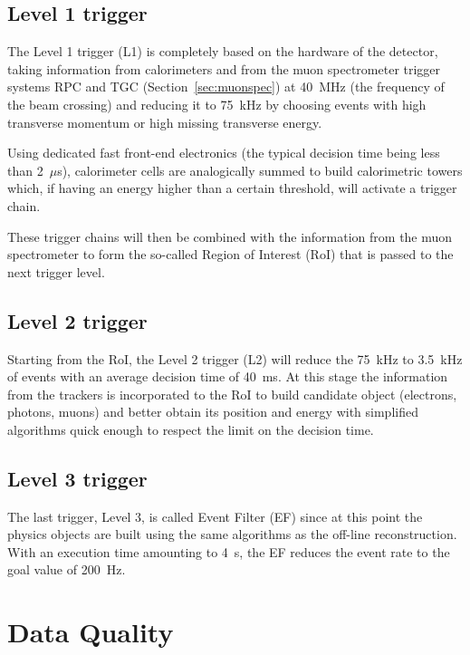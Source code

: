 \subsection{Level 1 trigger}\label{sec:lvl1}

The Level 1 trigger (L1) is completely based on the hardware of the detector,
taking information from calorimeters and from the muon spectrometer trigger
systems RPC and TGC (Section~\ref{sec:muonspec}) at 40~MHz (the frequency of
the beam crossing) and reducing it to 75~kHz by choosing events with high
transverse momentum or high missing transverse energy.

Using dedicated fast front-end electronics (the typical decision time being less than
2~$\mu$s), calorimeter cells are analogically 
summed to build calorimetric towers which, if having an energy higher than a 
certain threshold, will activate a trigger chain.

These trigger chains will then be combined with the information from the
muon spectrometer to form the so-called Region of Interest (RoI) that is
passed to the next trigger level.


\subsection{Level 2 trigger}\label{sec:lvl2}

Starting from the RoI, the Level 2 trigger (L2) will reduce the 75~kHz to
3.5~kHz of events with an average decision time of 40~ms. At this
stage the information from the trackers is incorporated to the RoI
to build candidate object (electrons, photons, muons) and 
better obtain its position and energy with simplified algorithms
quick enough to respect the limit on the decision time.

\subsection{Level 3 trigger}\label{sec:lvl3}

The last trigger, Level 3, is called Event Filter (EF) since
at this point the physics objects are built using the same
algorithms as the off-line reconstruction. With an execution time
amounting to 4~s, the EF reduces the event rate to the goal value
of 200~Hz.


\section{Data Quality}\label{sec:daq}
